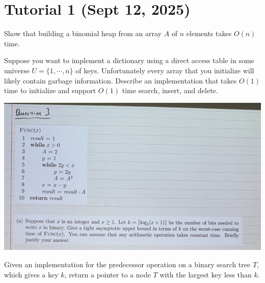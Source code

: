 \section{Tutorial 1 (Sept 12, 2025)}
\begin{problem}
Show that building a binomial heap from an array $A$ of $n$ elements takes $O(n)$ time. 
\end{problem}

\begin{problem}
Suppose you want to implement a dictionary using a direct access table in some universe $U = \{ 1, \cdots, n \}$ of keys. Unfortunately every array that you initialize will likely contain garbage information. Describe an implementation that takes $O(1)$ time to initialize and support $O(1)$ time search, insert, and delete.
\end{problem}

\begin{problem}
\end{problem}
\includegraphics{csc265/figures/tut1q3.jpg}

\begin{problem}
Given an implementation for the predecessor operation on a binary search tree $T$, which gives a key $k$, return a pointer to a node $T$ with the largest key less than $k$. 
\end{problem}
